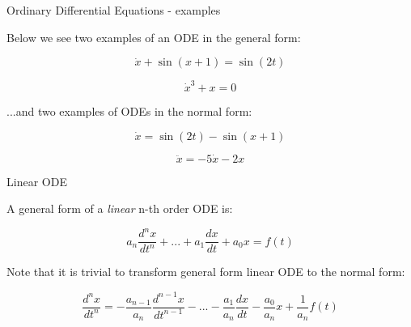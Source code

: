 \documentclass{beamer}
\begin{document}
\begin{frame}{Ordinary Differential Equations - examples}
	\begin{flushleft}
		
		Below we see two examples of an ODE in the general form:
		
		\begin{equation}
			\dot x + \sin (x+1) = \sin(2t)
		\end{equation}
		
		\begin{equation}
			\dot x^3 + x = 0
		\end{equation}
	
	...and two examples of ODEs in the normal form:
		
		\begin{equation}
			\dot x = \sin(2t) - \sin (x+1) 
		\end{equation}
		
		\begin{equation}
			\ddot x = -5\dot x - 2 x
		\end{equation}
		
	\end{flushleft}
\end{frame}



\begin{frame}{Linear ODE}
	\begin{flushleft}
		
		A general form of a \emph{linear} n-th order ODE is:
		
		\begin{equation}
			a_n \frac{d^n x}{dt^n} + ... + a_1 \frac{d x}{dt} + a_0 x  = f(t)
		\end{equation}
		
		\bigskip
		
		Note that it is trivial to transform general form linear ODE to the normal form:
		
		\begin{equation}
			\frac{d^n x}{dt^n} = -\frac{a_{n-1}}{a_n } \frac{d^{n-1} x}{dt^{n-1}} - ... - \frac{a_1}{a_n }  \frac{d x}{dt} - \frac{a_0}{a_n } x  + \frac{1}{a_n }f(t)
		\end{equation}
	
	\end{flushleft}
\end{frame}
\end{document}
